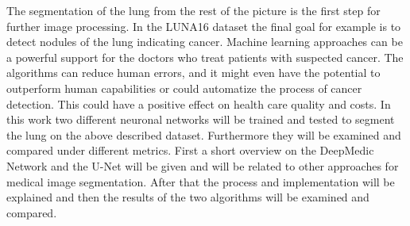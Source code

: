 The segmentation of the lung from the rest of the picture is the first step for further image processing. In the LUNA16 dataset the final goal for example is to detect nodules of the lung indicating cancer. Machine learning approaches can be a powerful support for the doctors who treat patients with suspected cancer. The algorithms can reduce human errors, and it might even have the potential to outperform human capabilities or could automatize the process of cancer detection. This could have a positive effect on health care quality and costs.\newline
In this work two different neuronal networks will be trained and tested to segment the lung on the above described dataset. Furthermore they will be examined and compared under different metrics.\newline
First a short overview on the DeepMedic Network and the U-Net will be given and will be related to other approaches for medical image segmentation. After that the process and implementation will be explained and then the results of the two algorithms will be examined and compared.
